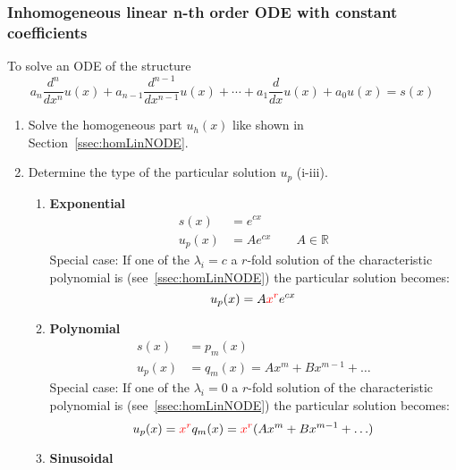 \subsubsection{Inhomogeneous linear n-th order ODE with constant coefficients}
To solve an ODE of the structure
\begin{equation*}
    a_n \frac{d^n}{dx^n} u(x) + a_{n-1} \frac{d^{n-1}}{dx^{n-1}} u(x) + \cdots + a_1 \frac{d}{dx} u(x) + a_0 u(x) = s(x)
\end{equation*}
\begin{enumerate}
    \item Solve the homogeneous part $u_h(x)$ like shown in Section~\ref{ssec:homLinNODE}.
    \item Determine the type of the particular solution $u_p$ (i-iii).
          \begin{enumerate}[label= (\roman*)]
              \item \textbf{Exponential}
                    \begin{align*}
                        s(x)   & = e^{cx}                          \\
                        u_p(x) & = Ae^{cx} \qquad A \in \mathbb{R}
                    \end{align*}
                    Special case:
                    If one of the $\lambda_i = c$ a $r$-fold solution of the characteristic polynomial is (see~\ref{ssec:homLinNODE}) the particular solution becomes:
                    \begin{equation*}
                        u_p(x) = A\textcolor{red}{x^r}e^{cx}
                    \end{equation*}
              \item \textbf{Polynomial}
                    \begin{align*}
                        s(x)   & = p_m(x)                            \\
                        u_p(x) & = q_m(x) = Ax^m + Bx^{m-1} + \ldots
                    \end{align*}
                    Special case:
                    If one of the $\lambda_i = 0$ a $r$-fold solution of the characteristic polynomial is (see~\ref{ssec:homLinNODE}) the particular solution becomes:
                    \begin{equation*}
                        u_p(x)= \textcolor{red}{x^r}q_m(x) = \textcolor{red}{x^r}(Ax^m + Bx^{m-1} + \ldots)
                    \end{equation*}
              \item \textbf{Sinusoidal}

\end{enumerate}
\end{enumerate}
